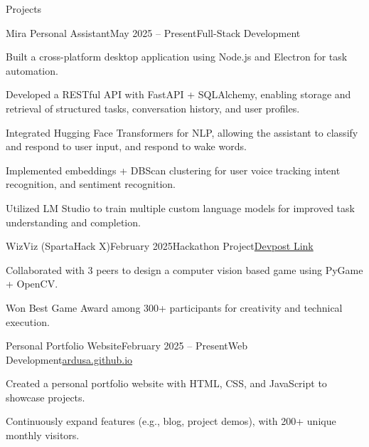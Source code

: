 \documentclass[
	11pt
]{resume}
\begin{document}
	\begin{rSection}{Projects}
		\begin{rSectionEntry}{Mira Personal Assistant}{May 2025 -- Present}{Full-Stack Development}{}
			\item Built a cross-platform desktop application using Node.js and Electron for task automation.
			\item Developed a RESTful API with FastAPI + SQLAlchemy, enabling storage and retrieval of structured tasks, conversation history, and user profiles.
			\item Integrated Hugging Face Transformers for NLP, allowing the assistant to classify and respond to user input, and respond to wake words.
			\item Implemented embeddings + DBScan clustering for user voice tracking intent recognition, and sentiment recognition.
			\item Utilized LM Studio to train multiple custom language models for improved task understanding and completion.
		\end{rSectionEntry}

		\begin{rSectionEntry}{WizViz (SpartaHack X)}{February 2025}{Hackathon Project}{\href{https://devpost.com/software/wizviz}{Devpost Link}}
			\item Collaborated with 3 peers to design a computer vision based game using PyGame + OpenCV.
			\item Won Best Game Award among 300+ participants for creativity and technical execution.
		\end{rSectionEntry}

		\begin{rSectionEntry}{Personal Portfolio Website}{February 2025 -- Present}{Web Development}{\href{https://ardusa.github.io/}{ardusa.github.io}}
			\item Created a personal portfolio website with HTML, CSS, and JavaScript to showcase projects.
			\item Continuously expand features (e.g., blog, project demos), with 200+ unique monthly visitors.
		\end{rSectionEntry}
	\end{rSection}
\end{document}
